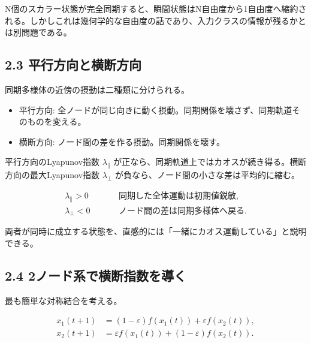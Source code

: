 \documentclass[11pt,a4paper]{ltjsarticle}
\begin{document}
N個のスカラー状態が完全同期すると、瞬間状態はN自由度から1自由度へ縮約される。しかしこれは幾何学的な自由度の話であり、入力クラスの情報が残るかとは別問題である。\par

\subsection*{\textcolor{researchblue}{2.3 平行方向と横断方向}}

同期多様体の近傍の摂動は二種類に分けられる。\par

\begin{itemize}

\item 平行方向: 全ノードが同じ向きに動く摂動。同期関係を壊さず、同期軌道そのものを変える。

\item 横断方向: ノード間の差を作る摂動。同期関係を壊す。

\end{itemize}

平行方向のLyapunov指数 \(\lambda_{\parallel}\) が正なら、同期軌道上ではカオスが続き得る。横断方向の最大Lyapunov指数 \(\lambda_{\perp}\) が負なら、ノード間の小さな差は平均的に縮む。\par

\[
\begin{aligned}
\lambda_{\parallel}>0&\quad &&\text{同期した全体運動は初期値鋭敏},\\
\lambda_{\perp}<0&\quad &&\text{ノード間の差は同期多様体へ戻る}.
\end{aligned}
\]

両者が同時に成立する状態を、直感的には「一緒にカオス運動している」と説明できる。\par

\subsection*{\textcolor{researchblue}{2.4 2ノード系で横断指数を導く}}

最も簡単な対称結合を考える。\par

\[
\begin{aligned}
x_1(t+1)&=(1-\varepsilon)f\!\left(x_1(t)\right)+\varepsilon f\!\left(x_2(t)\right),\\
x_2(t+1)&=\varepsilon f\!\left(x_1(t)\right)+(1-\varepsilon)f\!\left(x_2(t)\right).
\end{aligned}
\]
\end{document}
